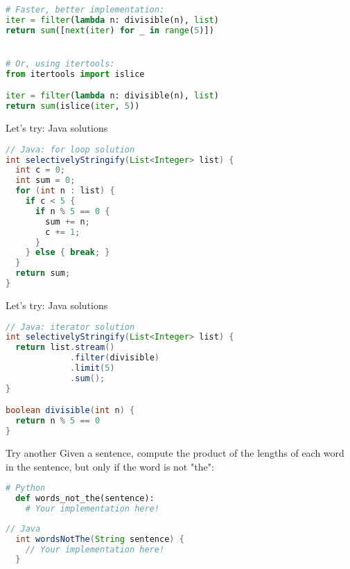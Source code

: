 \documentclass[../index.tex]{subfiles}
\begin{document}
\begin{frame}[fragile]{\currenttitle}
  \begin{lstlisting}[language=Python]
# Faster, better implementation:
iter = filter(lambda n: divisible(n), list)
return sum([next(iter) for _ in range(5)])


# Or, using itertools:
from itertools import islice

iter = filter(lambda n: divisible(n), list)
return sum(islice(iter, 5))
  \end{lstlisting}
\end{frame}

\renewcommand{\currenttitle}{Let's try: Java solutions}
\begin{frame}[fragile]{\currenttitle}
  \begin{lstlisting}[language=Java]
// Java: for loop solution
int selectivelyStringify(List<Integer> list) {
  int c = 0;
  int sum = 0;
  for (int n : list) {
    if c < 5 {
      if n % 5 == 0 {
        sum += n;
        c += 1;
      }
    } else { break; }
  }
  return sum;
}
  \end{lstlisting}
\end{frame}

\begin{frame}[fragile]{\currenttitle}
  \begin{lstlisting}[language=Java]
// Java: iterator solution
int selectivelyStringify(List<Integer> list) {
  return list.stream()
             .filter(divisible)
             .limit(5)
             .sum();
}

boolean divisible(int n) {
  return n % 5 == 0
}
  \end{lstlisting}
\end{frame}


\renewcommand{\currenttitle}{Try another}
\begin{frame}[fragile]{\currenttitle}
  Given a sentence, compute the product of the lengths of each word in the
  sentence, but only if the word is not "the":

  \begin{lstlisting}[language=Python]
  # Python
  def words_not_the(sentence):
    # Your implementation here!
  \end{lstlisting}

  \begin{lstlisting}[language=Java]
  // Java
  int wordsNotThe(String sentence) {
    // Your implementation here!
  }
  \end{lstlisting}
\end{frame}
\end{document}
